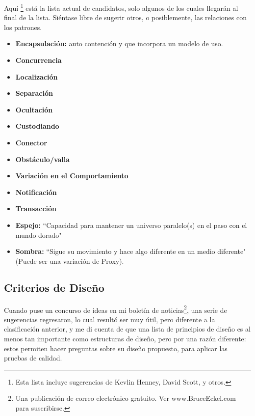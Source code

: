 Aquí \footnote{Esta lista incluye sugerencias de Kevlin Henney, David Scott, y otros.} está la lista actual de candidatos, solo algunos de los cuales llegarán al final de la lista. Siéntase libre de sugerir otros, o posiblemente, las relaciones con los patrones. \newline

\begin{itemize} %
    \item \textbf{Encapsulación:} auto contención y que incorpora un modelo de uso.
    \item \textbf{Concurrencia} %
    \item \textbf{Localización}
    \item \textbf{Separación}  %
    \item \textbf{Ocultación}
    \item \textbf{Custodiando}
    \item \textbf{Conector}
    \item \textbf{Obstáculo/valla}
    \item \textbf{Variación en el Comportamiento}
    \item \textbf{Notificación}
    \item \textbf{Transacción}
    \item \textbf{Espejo: }``Capacidad para mantener un universo paralelo(s) en el paso con el mundo dorado"
    \item \textbf{Sombra:} ``Sigue su movimiento y hace algo diferente en un medio diferente" (Puede ser una variación de Proxy).
\end{itemize}

\subsection*{Criterios de Diseño}
\label{subsec:cdd}

Cuando puse un concurso de ideas en mi boletín de noticias\footnote{Una publicación de correo electrónico gratuito. Ver www.BruceEckel.com para suscribirse.}, una serie de sugerencias regresaron, lo cual resultó ser muy útil, pero diferente a la clasificación anterior, y me di cuenta de que una lista de principios de diseño es al menos tan importante como estructuras de diseño, pero por una razón diferente: estos permiten hacer preguntas sobre su diseño propuesto, para aplicar las pruebas de calidad.   \newline


